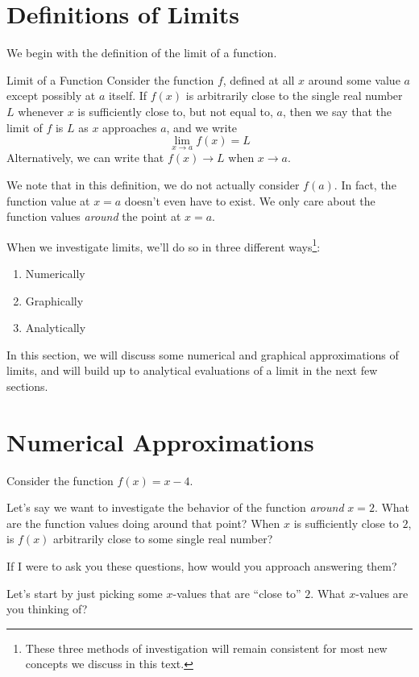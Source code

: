 \section{Definitions of Limits}

We begin with the definition of the limit of a function.

\begin{thm}{Limit of a Function}
  Consider the function $f$, defined at all $x$ around some value $a$ except possibly at $a$ itself.
  If $f(x)$ is arbitrarily close to the single real number $L$ whenever $x$ is sufficiently close to, but not equal to, $a$, then we say that the limit of $f$ is $L$ as $x$ approaches $a$, and we write
  \[\lim_{x\to a} f(x) = L\]
  Alternatively, we can write that $f(x)\to L$ when $x\to a$.
\end{thm}

We note that in this definition, we do not actually consider $f(a)$.
In fact, the function value at $x=a$ doesn't even have to exist.
We only care about the function values \textit{around} the point at $x=a$.

When we investigate limits, we'll do so in three different ways\footnote{
These three methods of investigation will remain consistent for most new concepts we discuss in this text.}:
\begin{enumerate}
  \item Numerically
  \item Graphically
  \item Analytically
\end{enumerate}

In this section, we will discuss some numerical and graphical approximations of limits, and will build up to analytical evaluations of a limit in the next few sections.

\section*{Numerical Approximations}

Consider the function $f(x) = x-4$.

Let's say we want to investigate the behavior of the function \textit{around} $x=2$.
What are the function values doing around that point?
When $x$ is sufficiently close to $2$, is $f(x)$ arbitrarily close to some single real number?

If I were to ask you these questions, how would you approach answering them?

Let's start by just picking some $x$-values that are ``close to'' $2$.
What $x$-values are you thinking of?

